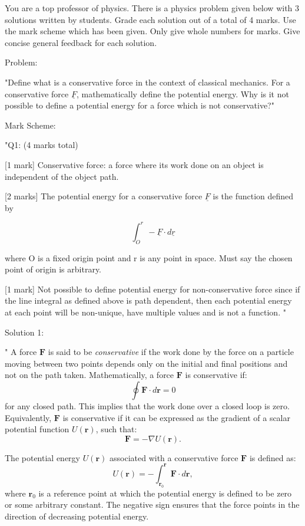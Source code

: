 You are a top professor of physics. There is a physics problem given below with 3 solutions written by students. Grade each solution out of a total of 4 marks. Use the mark scheme which has been given. Only give whole numbers for marks. Give concise general feedback for each solution.

Problem: 

"Define what is a conservative force in the context of classical mechanics. For a conservative force \( \underline{F} \), mathematically define the potential energy. Why is it not possible to define a potential energy for a force which is not conservative?"

Mark Scheme:

"{Q1: (4 marks total)}

[1 mark] Conservative force: a force where its work done on an object is independent of the object path.

[2 marks] The potential energy for a conservative force \( \underline{F} \) is the function defined by 

\[ \int_{O}^{r} - \underline{F} \cdot d\underline{r} \] 

where O is a fixed origin point and r is any point in space. Must say the chosen point of origin is arbitrary.  

[1 mark] Not possible to define potential energy for non-conservative force since if the line integral as defined above is path dependent, then each potential energy at each point will be non-unique, have multiple values and is not a function. 
"

Solution 1: 

"
A force $\mathbf{F}$ is said to be \textit{conservative} if the work done by the force on a particle moving between two points depends only on the initial and final positions and not on the path taken. Mathematically, a force $\mathbf{F}$ is conservative if:
\[
\oint \mathbf{F} \cdot d\mathbf{r} = 0
\]
for any closed path. This implies that the work done over a closed loop is zero. Equivalently, $\mathbf{F}$ is conservative if it can be expressed as the gradient of a scalar potential function $U(\mathbf{r})$, such that:
\[
\mathbf{F} = -\nabla U(\mathbf{r}).
\]

The potential energy $U(\mathbf{r})$ associated with a conservative force $\mathbf{F}$ is defined as:
\[
U(\mathbf{r}) = - \int_{\mathbf{r}_0}^{\mathbf{r}} \mathbf{F} \cdot d\mathbf{r},
\]
where $\mathbf{r}_0$ is a reference point at which the potential energy is defined to be zero or some arbitrary constant. The negative sign ensures that the force points in the direction of decreasing potential energy.

